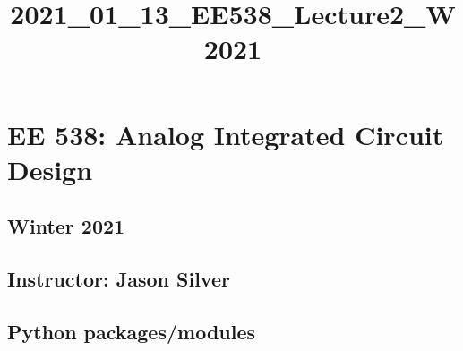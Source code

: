 \documentclass[11pt]{article}
\title{2021\_01\_13\_EE538\_Lecture2\_W2021}
\begin{document}
    
    \maketitle
    
    

    
    \hypertarget{ee-538-analog-integrated-circuit-design}{%
\section{EE 538: Analog Integrated Circuit
Design}\label{ee-538-analog-integrated-circuit-design}}

\hypertarget{winter-2021}{%
\subsection{Winter 2021}\label{winter-2021}}

\hypertarget{instructor-jason-silver}{%
\subsection{Instructor: Jason Silver}\label{instructor-jason-silver}}

    \hypertarget{python-packagesmodules}{%
\subsection{Python packages/modules}\label{python-packagesmodules}}
\end{document}
